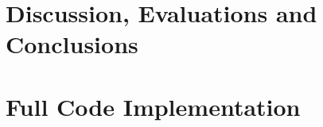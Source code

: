 \documentclass[a4paper, 11pt, oneside]{Thesis}  %
\begin{document}
\part{Discussion, Evaluations and Conclusions}

%



\part{Full Code Implementation}
\begin{appendix}





\end{appendix}



\end{document}
